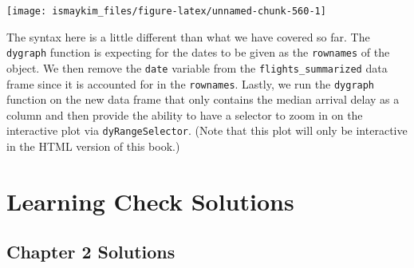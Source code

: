 \documentclass[12pt, krantz2,]{krantz}
\makeatletter
\newenvironment{Shaded}{\begin{snugshade}}{\end{snugshade}}
\newcommand{\DataTypeTok}[1]{\textcolor[rgb]{0.27,0.27,0.27}{#1}}
\newcommand{\KeywordTok}[1]{\textcolor[rgb]{0.27,0.27,0.27}{\textbf{#1}}}
\newcommand{\NormalTok}[1]{#1}
\newcommand{\OperatorTok}[1]{\textcolor[rgb]{0.43,0.43,0.43}{\textbf{#1}}}
\newcommand{\OtherTok}[1]{\textcolor[rgb]{0.37,0.37,0.37}{#1}}
\newcommand{\StringTok}[1]{\textcolor[rgb]{0.5,0.5,0.5}{#1}}
\newenvironment{kframe}{%
\medskip{}
\setlength{\fboxsep}{.8em}
 \def\at@end@of@kframe{}%
 \ifinner\ifhmode%
  \def\at@end@of@kframe{\end{minipage}}%
  \begin{minipage}{\columnwidth}%
 \fi\fi%
 \def\FrameCommand##1{\hskip\@totalleftmargin \hskip-\fboxsep
 \colorbox{shadecolor}{##1}\hskip-\fboxsep
     \hskip-\linewidth \hskip-\@totalleftmargin \hskip\columnwidth}%
 \MakeFramed {\advance\hsize-\width
   \@totalleftmargin\z@ \linewidth\hsize
   \@setminipage}}%
 {\par\unskip\endMakeFramed%
 \at@end@of@kframe}
\renewenvironment{Shaded}{\begin{kframe}}{\end{kframe}}
\makeatother
\begin{document}
\begin{Shaded}
\end{Shaded}

\begin{center}\texttt{[image: ismaykim\_files/figure-latex/unnamed-chunk-560-1]} \end{center}

The syntax here is a little different than what we have covered so far. The \texttt{dygraph} function is expecting for the dates to be given as the \texttt{rownames} of the object. We then remove the \texttt{date} variable from the \texttt{flights\_summarized} data frame since it is accounted for in the \texttt{rownames}. Lastly, we run the \texttt{dygraph} function on the new data frame that only contains the median arrival delay as a column and then provide the ability to have a selector to zoom in on the interactive plot via \texttt{dyRangeSelector}. (Note that this plot will only be interactive in the HTML version of this book.)

\hypertarget{appendixD}{%
\chapter{Learning Check Solutions}\label{appendixD}}

\hypertarget{chapter-2-solutions}{%
\section{Chapter 2 Solutions}\label{chapter-2-solutions}}
\end{document}
